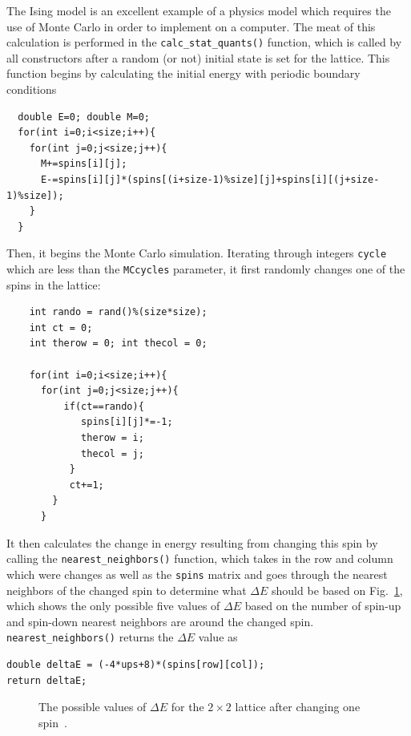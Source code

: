 \documentclass[12pt]{article}
\numberwithin{equation}{section}
\begin{document}
\par The Ising model is an excellent example of a physics model which requires the use of Monte Carlo in order to implement on a computer.  The meat of this calculation is performed in the \texttt{calc\_stat\_quants()} function, which is called by all constructors after a random (or not) initial state is set for the lattice.  This function begins by calculating the initial energy with periodic boundary conditions
\begin{verbatim}
  double E=0; double M=0;
  for(int i=0;i<size;i++){
    for(int j=0;j<size;j++){
      M+=spins[i][j];
      E-=spins[i][j]*(spins[(i+size-1)%size][j]+spins[i][(j+size-1)%size]);
    }
  }
\end{verbatim}
Then, it begins the Monte Carlo simulation.  Iterating through integers \texttt{cycle} which are less than the \texttt{MCcycles} parameter, it first randomly changes one of the spins in the lattice:
\begin{verbatim}
    int rando = rand()%(size*size); 
    int ct = 0;
    int therow = 0; int thecol = 0;
    
    for(int i=0;i<size;i++){
      for(int j=0;j<size;j++){
          if(ct==rando){
             spins[i][j]*=-1;
             therow = i;
             thecol = j;
           }
           ct+=1;
        }
      }
\end{verbatim}
It then calculates the change in energy resulting from changing this spin by calling the \texttt{nearest\_neighbors()} function, which    takes in the row and column which were changes as well as the \texttt{spins} matrix and goes through the nearest neighbors of the changed spin to determine what $\Delta E$ should be based on Fig.~\ref{fig:deltaEs}, which shows the only possible five values of $\Delta E$ based on the number of spin-up and spin-down nearest neighbors are around the changed spin.  \texttt{nearest\_neighbors()} returns the $\Delta E$ value as 
\begin{verbatim}
double deltaE = (-4*ups+8)*(spins[row][col]);
return deltaE;
\end{verbatim}

\begin{figure}[ht]
\begin{center}
\caption{The possible values of $\Delta E$ for the $2\times2$ lattice after changing one spin~\cite{lecture}.}
\label{fig:deltaEs}
\end{center}
\end{figure}
\end{document}
